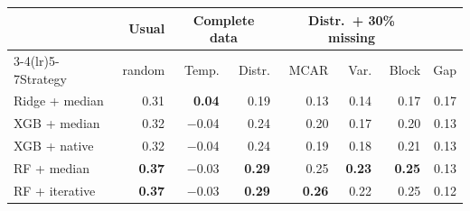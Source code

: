 \begin{tabular}{lrrrrrrr}
\toprule
 & Usual & \multicolumn{2}{c}{Complete data} & \multicolumn{3}{c}{Distr.\ + 30\% missing} & \\ \cmidrule(lr){3-4}\cmidrule(lr){5-7}Strategy & random & Temp. & Distr. & MCAR & Var. & Block & Gap \\
\midrule
Ridge + median & 0.31 & \textbf{0.04} & 0.19 & 0.13 & 0.14 & 0.17 & 0.17 \\
XGB + median & 0.32 & $-$0.04 & 0.24 & 0.20 & 0.17 & 0.20 & 0.13 \\
XGB + native & 0.32 & $-$0.04 & 0.24 & 0.19 & 0.18 & 0.21 & 0.13 \\
RF + median & \textbf{0.37} & $-$0.03 & \textbf{0.29} & 0.25 & \textbf{0.23} & \textbf{0.25} & 0.13 \\
RF + iterative & \textbf{0.37} & $-$0.03 & \textbf{0.29} & \textbf{0.26} & 0.22 & 0.25 & 0.12 \\
\bottomrule
\end{tabular}
